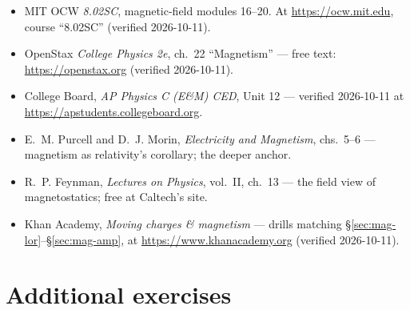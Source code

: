\begin{itemize}
\item MIT OCW \emph{8.02SC}, magnetic-field modules 16--20. At
\url{https://ocw.mit.edu}, course ``8.02SC'' (verified 2026-10-11).
\item OpenStax \emph{College Physics 2e}, ch.~22 ``Magnetism'' ---
free text: \url{https://openstax.org} (verified 2026-10-11).
\item College Board, \emph{AP Physics C (E\&M) CED}, Unit 12 ---
verified 2026-10-11 at \url{https://apstudents.collegeboard.org}.
\item E.~M. Purcell and D.~J. Morin, \emph{Electricity and Magnetism},
chs.~5--6 --- magnetism as relativity's corollary; the deeper anchor.
\item R.~P. Feynman, \emph{Lectures on Physics}, vol.~II, ch.~13 ---
the field view of magnetostatics; free at Caltech's site.
\item Khan Academy, \emph{Moving charges \& magnetism} --- drills
matching \S\ref{sec:mag-lor}--\S\ref{sec:mag-amp}, at
\url{https://www.khanacademy.org} (verified 2026-10-11).
\end{itemize}

\section*{Additional exercises}

